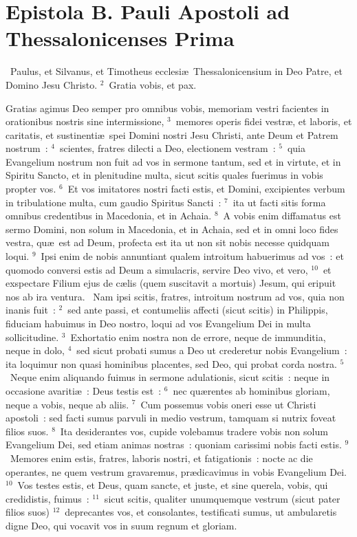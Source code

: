 {\centering \section*{Epistola B. Pauli Apostoli ad Thessalonicenses Prima}}\thispagestyle{empty}

~Paulus, et Silvanus, et Timotheus ecclesi\ae\ Thessalonicensium in Deo Patre, et Domino Jesu Christo.
${}^{2}$~Gratia vobis, et pax.

 Gratias agimus Deo semper pro omnibus vobis, memoriam vestri facientes in orationibus nostris sine intermissione,
${}^{3}$~memores operis fidei vestr\ae , et laboris, et caritatis, et sustinenti\ae\ spei Domini nostri Jesu Christi, ante Deum et Patrem nostrum~:
${}^{4}$~scientes, fratres dilecti a Deo, electionem vestram~:
${}^{5}$~quia Evangelium nostrum non fuit ad vos in sermone tantum, sed et in virtute, et in Spiritu Sancto, et in plenitudine multa, sicut scitis quales fuerimus in vobis propter vos.
${}^{6}$~Et vos imitatores nostri facti estis, et Domini, excipientes verbum in tribulatione multa, cum gaudio Spiritus Sancti~:
${}^{7}$~ita ut facti sitis forma omnibus credentibus in Macedonia, et in Achaia.
${}^{8}$~A vobis enim diffamatus est sermo Domini, non solum in Macedonia, et in Achaia, sed et in omni loco fides vestra, qu\ae\ est ad Deum, profecta est ita ut non sit nobis necesse quidquam loqui.
${}^{9}$~Ipsi enim de nobis annuntiant qualem introitum habuerimus ad vos~: et quomodo conversi estis ad Deum a simulacris, servire Deo vivo, et vero,
${}^{10}$~et exspectare Filium ejus de c\ae lis (quem suscitavit a mortuis) Jesum, qui eripuit nos ab ira ventura.
~Nam ipsi scitis, fratres, introitum nostrum ad vos, quia non inanis fuit~:
${}^{2}$~sed ante passi, et contumeliis affecti (sicut scitis) in Philippis, fiduciam habuimus in Deo nostro, loqui ad vos Evangelium Dei in multa sollicitudine.
${}^{3}$~Exhortatio enim nostra non de errore, neque de immunditia, neque in dolo,
${}^{4}$~sed sicut probati sumus a Deo ut crederetur nobis Evangelium~: ita loquimur non quasi hominibus placentes, sed Deo, qui probat corda nostra.
${}^{5}$~Neque enim aliquando fuimus in sermone adulationis, sicut scitis~: neque in occasione avariti\ae~: Deus testis est~:
${}^{6}$~nec qu\ae rentes ab hominibus gloriam, neque a vobis, neque ab aliis.
${}^{7}$~Cum possemus vobis oneri esse ut Christi apostoli~: sed facti sumus parvuli in medio vestrum, tamquam si nutrix foveat filios suos.
${}^{8}$~Ita desiderantes vos, cupide volebamus tradere vobis non solum Evangelium Dei, sed etiam animas nostras~: quoniam carissimi nobis facti estis.
${}^{9}$~Memores enim estis, fratres, laboris nostri, et fatigationis~: nocte ac die operantes, ne quem vestrum gravaremus, pr\ae dicavimus in vobis Evangelium Dei.
${}^{10}$~Vos testes estis, et Deus, quam sancte, et juste, et sine querela, vobis, qui credidistis, fuimus~:
${}^{11}$~sicut scitis, qualiter unumquemque vestrum (sicut pater filios suos)
${}^{12}$~deprecantes vos, et consolantes, testificati sumus, ut ambularetis digne Deo, qui vocavit vos in suum regnum et gloriam.


